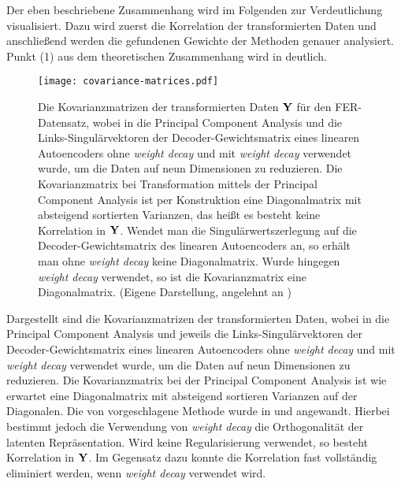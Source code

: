 Der eben beschriebene Zusammenhang wird im Folgenden zur Verdeutlichung visualisiert. Dazu wird
zuerst die Korrelation der transformierten Daten und anschließend werden die gefundenen Gewichte
der Methoden genauer analysiert. Punkt (1) aus dem theoretischen Zusammenhang wird in
 deutlich.
\begin{figure}[ht]
	\centering
	\texttt{[image: covariance-matrices.pdf]}
	\caption[Kovarianzmatrizen der transformierten Daten $\mat{Y}$ für den FER-Datensatz von drei Methoden]{Die Kovarianzmatrizen der transformierten Daten $\mat{Y}$ für den FER-Datensatz, wobei in \captiona die Principal Component Analysis und die Links-Singulärvektoren der Decoder-Gewichtsmatrix eines linearen Autoencoders \captionb ohne \textit{weight decay} und \captionc mit \textit{weight decay} verwendet wurde, um die Daten auf neun Dimensionen zu reduzieren. Die Kovarianzmatrix bei Transformation mittels der Principal Component Analysis ist per Konstruktion eine Diagonalmatrix mit absteigend sortierten Varianzen, das heißt es besteht keine Korrelation in $\mat{Y}$. Wendet man die Singulärwertszerlegung auf die Decoder-Gewichtsmatrix des linearen Autoencoders an, so erhält man ohne \textit{weight decay} keine Diagonalmatrix. Wurde hingegen \textit{weight decay} verwendet, so ist die Kovarianzmatrix eine Diagonalmatrix. (Eigene Darstellung, angelehnt an \textcite[5]{Plaut.2018})}
	\label{fig:Kovarianzmatrizen}
\end{figure} Dargestellt sind die Kovarianzmatrizen der transformierten Daten, wobei in \captiona die Principal Component Analysis und jeweils die Links-Singulärvektoren der Decoder-Gewichtsmatrix eines linearen Autoencoders \captionb ohne \textit{weight decay} und \captionc mit \textit{weight decay} verwendet wurde, um die Daten auf neun Dimensionen zu reduzieren. Die Kovarianzmatrix bei der Principal Component Analysis ist wie erwartet eine Diagonalmatrix mit absteigend sortieren Varianzen auf der Diagonalen. Die von \textcite{Plaut.2018} vorgeschlagene Methode wurde in \captionb und \captionc angewandt. Hierbei bestimmt jedoch die Verwendung von \textit{weight decay} die Orthogonalität der latenten Repräsentation. Wird keine Regularisierung verwendet, so besteht Korrelation in $\mat{Y}$. Im Gegensatz dazu konnte die Korrelation fast vollständig eliminiert werden, wenn \textit{weight decay} verwendet wird.

